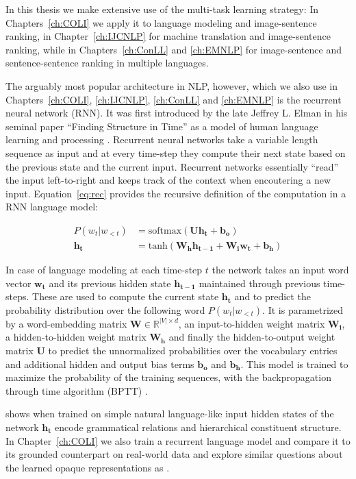 In this thesis we make extensive use of the  multi-task learning strategy: 
In Chapters~\ref{ch:COLI} we apply it to language modeling and image-sentence ranking, 
in Chapter~\ref{ch:IJCNLP} for machine translation
and image-sentence ranking, while in Chapters~\ref{ch:ConLL} and \ref{ch:EMNLP} for image-sentence
and sentence-sentence ranking in multiple languages.

The arguably most popular architecture in NLP, however, which we also use in
Chapters~\ref{ch:COLI}, \ref{ch:IJCNLP}, \ref{ch:ConLL} and \ref{ch:EMNLP}
is the recurrent neural network (RNN). It was
first introduced by the late Jeffrey L. Elman in his seminal paper  ``Finding Structure in Time''
as a model of human language learning and processing \citep{elman1990finding}. Recurrent neural networks
take a variable length sequence as input and at every time-step they compute their next state
based on the previous state and the current input. Recurrent networks 
essentially ``read'' the input left-to-right and keeps track of the context when encoutering a new input.
Equation~\ref{eq:rec} provides the recursive definition of the computation in a RNN language model:

\begin{align}
\label{eq:rec}
P(w_t|w_{<t}) &= \text{softmax}(\mathbf{U} \mathbf{h_t} + \mathbf{b_o}) \\
\mathbf{h_t} &= \text{tanh}(\mathbf{W_h}\mathbf{h_{t-1}} + \mathbf{W_i}\mathbf{w_t} + \mathbf{b_h})
\end{align}

In case of language modeling at each time-step $t$ the network takes an input word vector $\mathbf{w_t}$
and its previous hidden state $\mathbf{h_{t-1}}$ maintained through previous
time-steps. These are used to compute the current
state $\mathbf{h_t}$ and to predict the probability distribution over the following word $P(w_t|w_{<t})$.
It is parametrized by a word-embedding matrix $\mathbf{W} \in \mathbb{R}^{|V| \times d}$,
an input-to-hidden weight matrix $\mathbf{W_i}$, a hidden-to-hidden weight
matrix $\mathbf{W_h}$ and finally the hidden-to-output
weight matrix $\mathbf{U}$ to predict the unnormalized probabilities over the vocabulary entries and additional
hidden and output bias terms $ \mathbf{b_o}$ and $ \mathbf{b_h}$.
This model is trained to maximize the probability of the training sequences, 
with the backpropagation through time algorithm (BPTT)
\citep{robinson1987utility,werbos1988generalization,williams1995gradient}.

\cite{elman1991distributed} shows when trained on simple natural language-like input
hidden states of the network $\mathbf{h_t}$ encode grammatical relations and hierarchical
constituent structure. In Chapter~\ref{ch:COLI} we also train a recurrent language model
and compare it to its grounded counterpart
on real-world data and explore similar questions about the learned opaque representations
as \cite{elman1991distributed}.


